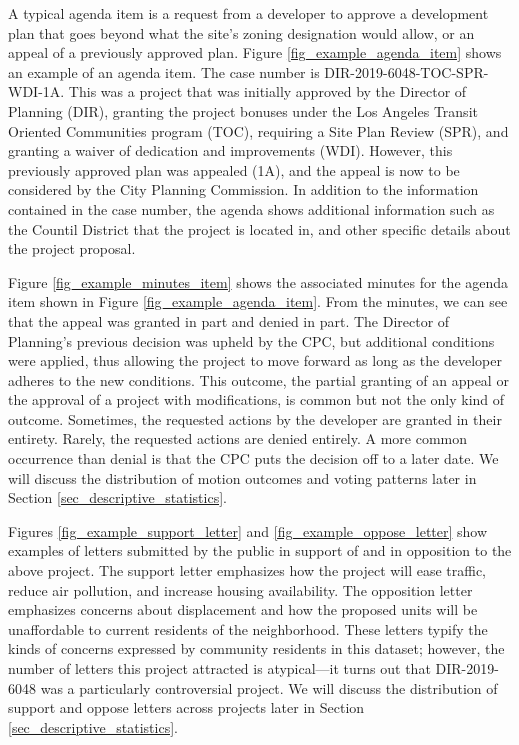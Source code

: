 A typical agenda item is a request from a developer to approve a development plan that goes beyond what the site's zoning designation would allow, or an appeal of a previously approved plan. Figure \ref{fig_example_agenda_item} shows an example of an agenda item. The case number is DIR-2019-6048-TOC-SPR-WDI-1A. This was a project that was initially approved by the Director of Planning (DIR), granting the project bonuses under the Los Angeles Transit Oriented Communities program (TOC), requiring a Site Plan Review (SPR), and granting a waiver of dedication and improvements (WDI). However, this previously approved plan was appealed (1A), and the appeal is now to be considered by the City Planning Commission. In addition to the information contained in the case number, the agenda shows additional information such as the Countil District that the project is located in, and other specific details about the project proposal.

Figure \ref{fig_example_minutes_item} shows the associated minutes for the agenda item shown in Figure \ref{fig_example_agenda_item}. From the minutes, we can see that the appeal was granted in part and denied in part. The Director of Planning's previous decision was upheld by the CPC, but additional conditions were applied, thus allowing the project to move forward as long as the developer adheres to the new conditions. This outcome, the partial granting of an appeal or the approval of a project with modifications, is common but not the only kind of outcome. Sometimes, the requested actions by the developer are granted in their entirety. Rarely, the requested actions are denied entirely. A more common occurrence than denial is that the CPC puts the decision off to a later date. We will discuss the distribution of motion outcomes and voting patterns later in Section \ref{sec_descriptive_statistics}.

Figures \ref{fig_example_support_letter} and \ref{fig_example_oppose_letter} show examples of letters submitted by the public in support of and in opposition to the above project. The support letter emphasizes how the project will ease traffic, reduce air pollution, and increase housing availability. The opposition letter emphasizes concerns about displacement and how the proposed units will be unaffordable to current residents of the neighborhood. These letters typify the kinds of concerns expressed by community residents in this dataset; however, the number of letters this project attracted is atypical---it turns out that DIR-2019-6048 was a particularly controversial project. We will discuss the distribution of support and oppose letters across projects later in Section \ref{sec_descriptive_statistics}.

